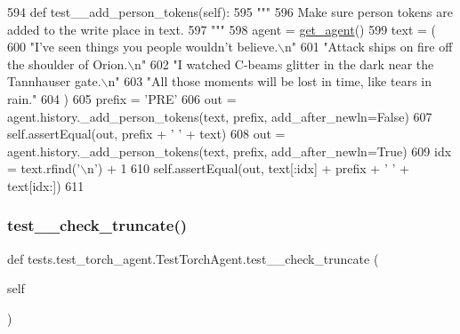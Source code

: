 \begin{DoxyCode}
594     \textcolor{keyword}{def }test\_\_add\_person\_tokens(self):
595         \textcolor{stringliteral}{"""}
596 \textcolor{stringliteral}{        Make sure person tokens are added to the write place in text.}
597 \textcolor{stringliteral}{        """}
598         agent = \hyperlink{namespacetests_1_1test__torch__agent_ae929d109305aaea29fbfa13ecf1f32e9}{get\_agent}()
599         text = (
600             \textcolor{stringliteral}{"I've seen things you people wouldn't believe.\(\backslash\)n"}
601             \textcolor{stringliteral}{"Attack ships on fire off the shoulder of Orion.\(\backslash\)n"}
602             \textcolor{stringliteral}{"I watched C-beams glitter in the dark near the Tannhauser gate.\(\backslash\)n"}
603             \textcolor{stringliteral}{"All those moments will be lost in time, like tears in rain."}
604         )
605         prefix = \textcolor{stringliteral}{'PRE'}
606         out = agent.history.\_add\_person\_tokens(text, prefix, add\_after\_newln=\textcolor{keyword}{False})
607         self.assertEqual(out, prefix + \textcolor{stringliteral}{' '} + text)
608         out = agent.history.\_add\_person\_tokens(text, prefix, add\_after\_newln=\textcolor{keyword}{True})
609         idx = text.rfind(\textcolor{stringliteral}{'\(\backslash\)n'}) + 1
610         self.assertEqual(out, text[:idx] + prefix + \textcolor{stringliteral}{' '} + text[idx:])
611 
\end{DoxyCode}
\mbox{\label{classtests_1_1test__torch__agent_1_1TestTorchAgent_ab5ef383cb36b970850bb3e171c832f36}} 
\subsubsection{\texorpdfstring{test\+\_\+\+\_\+check\+\_\+truncate()}{test\_\_check\_truncate()}}
{\footnotesize\ttfamily def tests.\+test\+\_\+torch\+\_\+agent.\+Test\+Torch\+Agent.\+test\+\_\+\+\_\+check\+\_\+truncate (\begin{DoxyParamCaption}\item[{}]{self }\end{DoxyParamCaption})}


